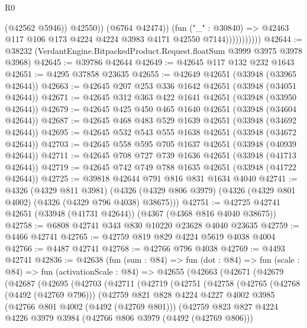 \begin{lexlean}{R0}
\begin{coremodule}
                                (@42562 @5946))
                              @42550))
                          (@6764 @42474))
                        (fun ("_" : @30840) =>
                        @42463 @117 @106 @173 @4224 @4224 @3983 @4171 @42550 @7144)))))))))))
@42644 := @38232 (VerdantEngine.BitpackedProduct.Request.floatSum @3999 @3975 @3978 @3968)
@42645 := @39786 @42644
@42649 := @42645 @117 @132 @232 @1643
@42651 := @4295 @37858 @23635
@42655 := @42649 @42651 (@33948 (@33965 @42644))
@42663 := @42645 @207 @253 @336 @1642 @42651 (@33948 (@34051 @42644))
@42671 := @42645 @312 @363 @422 @1641 @42651 (@33948 (@33950 @42644))
@42679 := @42645 @425 @450 @465 @1640 @42651 (@33948 (@34604 @42644))
@42687 := @42645 @468 @483 @529 @1639 @42651 (@33948 (@34692 @42644))
@42695 := @42645 @532 @543 @555 @1638 @42651 (@33948 (@34672 @42644))
@42703 := @42645 @558 @595 @705 @1637 @42651 (@33948 (@40939 @42644))
@42711 := @42645 @708 @727 @739 @1636 @42651 (@33948 (@41713 @42644))
@42719 := @42645 @742 @749 @788 @1635 @42651 (@33948 (@41722 @42644))
@42725 := @39818 @42644 @791 @816 @831 @1634 @4040
@42741 := @4326
    (@4329 @811 @3981)
    (@4326 (@4329 @806 @3979) (@4326 (@4329 @801 @4002) (@4326 (@4329 @796 @4038) @38675)))
@42751 := @42725 @42741 @42651 (@33948 (@41731 @42644)) (@4367 (@4368 @816 @4040 @38675))
@42758 := @6808 @42741 @343 @830 @10220 @23628 @4040 @23635
@42759 := @4466 @42741
@42765 := @42759 @819 @829 @4224 @5619 @4038 @4004
@42766 := @4487 @42741
@42768 := @42766 @796 @4038
@42769 := @4493 @42741
@42836 := @42638
    (fun (sum : @84) =>
    fun (dot : @84) =>
    fun (scale : @84) =>
    fun (activationScale : @84) =>
    @42655
      (@42663
        (@42671
          (@42679
            (@42687
              (@42695
                (@42703
                  (@42711
                    (@42719
                      (@42751
                        (@42758
                          (@42765
                            (@42768 (@4492 (@42769 @796)))
                            (@42759
                              @821
                              @828
                              @4224
                              @4227
                              @4002
                              @3985
                              (@42766 @801 @4002 (@4492 (@42769 @801)))
                              (@42759
                                @823
                                @827
                                @4224
                                @4226
                                @3979
                                @3984
                                (@42766 @806 @3979 (@4492 (@42769 @806)))

\end{coremodule}
\end{lexlean}
